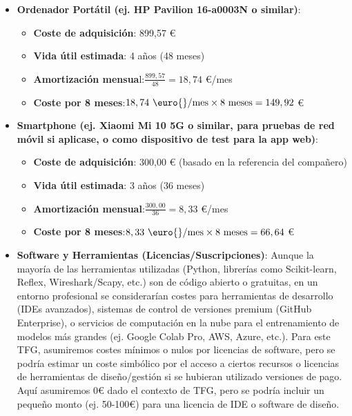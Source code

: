 \begin{itemize}

    \item\textbf{Ordenador Portátil (ej. HP Pavilion 16-a0003N o similar)}:
        \begin{itemize}

            \item\textbf{Coste de adquisición}: 899,57 \euro{} 
            
            \item\textbf{Vida útil estimada}: 4 años (48 meses)
            
            \item\textbf{Amortización mensua}l:$\displaystyle \frac{899,57}{48} = 18,74 $ \euro{}/mes
            
            \item\textbf{Coste por 8 meses}:$\displaystyle 18,74 \text{ \euro{}/mes} \times 8 \text{ meses} = 149,92 $ \euro{}
                   
        \end{itemize}
    
    \item\textbf{Smartphone (ej. Xiaomi Mi 10 5G o similar, para pruebas de red móvil si aplicase, o como dispositivo de test para la app web)}:
    
        \begin{itemize}
        
            \item\textbf{Coste de adquisición}: 300,00 \euro{} (basado en la referencia del compañero)
            
            \item\textbf{Vida útil estimada}: 3 años (36 meses)
            
            \item\textbf{Amortización mensual}:$\displaystyle \frac{300,00}{36} = 8,33 $ \euro{}/mes
            
            \item\textbf{Coste por 8 meses}:$\displaystyle 8,33 \text{ \euro{}/mes} \times 8 \text{ meses} = 66,64 $ \euro{}
                
        \end{itemize}
    
    \item\textbf{Software y Herramientas (Licencias/Suscripciones)}:
    Aunque la mayoría de las herramientas utilizadas (Python, librerías como Scikit-learn, Reflex, Wireshark/Scapy, etc.) son de código abierto o gratuitas, en un entorno profesional se considerarían costes para herramientas de desarrollo (IDEs avanzados), sistemas de control de versiones premium (GitHub Enterprise), o servicios de computación en la nube para el entrenamiento de modelos más grandes (ej. Google Colab Pro, AWS, Azure, etc.). Para este TFG, asumiremos costes mínimos o nulos por licencias de software, pero se podría estimar un coste simbólico por el acceso a ciertos recursos o licencias de herramientas de diseño/gestión si se hubieran utilizado versiones de pago. Aquí asumiremos 0€ dado el contexto de TFG, pero se podría incluir un pequeño monto (ej. 50-100€) para una licencia de IDE o software de diseño.
    

\end{itemize}
